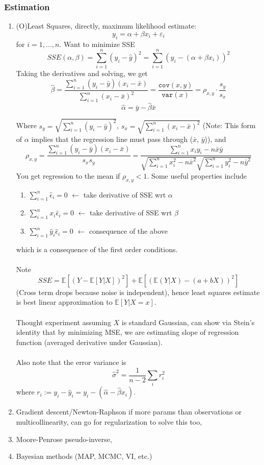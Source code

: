 \documentclass{article}
\begin{document}
\subsubsection{Estimation}
\begin{enumerate}
  \item (O)Least Squares, directly, maximum likelihood estimate:
    $$ y_i = \alpha + \beta x_i + \varepsilon_i $$ for $i=1,\ldots, n$.
    Want to minimize SSE
    $$ SSE(\alpha, \beta) = \sum_{i=1}^{n} (y_i - \hat{y})^2 = \sum_{i=1}^{n} (y_i - (\alpha + \beta x_i))^2$$
    Taking the derivatives and solving, we get
    $$ \hat{\beta} = \frac{\sum_{i=1}^{n}(y_i - \bar{y})(x_i - \bar{x})}{\sum_{i=1}^{n}(x_i - \bar{x})^2} = \frac{\mathtt{cov}(x, y)}{\mathtt{var}(x)} = \rho_{x, y} \cdot \frac{s_y}{s_x}$$
    $$ \hat{\alpha} = \bar{y} - \hat{\beta} \bar{x}$$

    Where $s_y = \sqrt{\sum_{i=1}^{n}(y_i - \bar{y})^2}$,  $s_x = \sqrt{\sum_{i=1}^{n}(x_i - \bar{x})^2}$ (Note: This form of $\alpha$ implies that the regression line must pass through ($\bar{x}$, $\bar{y}$)), and
    $$\rho_{x, y} = \frac{\sum_{i=1}^{n}(y_i - \bar{y})(x_i - \bar{x})}{s_x s_y} = \frac{\sum_{i=1}^{n}x_iy_i - n\bar{x}\bar{y}}{\sqrt{\sum_{i=1}^{n}x_i^2 - n \bar{x}^2}\sqrt{\sum_{i=1}^{n}y_i^2 - n \bar{y}^2}}$$
    You get regression to the mean if $\rho_{x, y} < 1$. Some useful properties include
    \begin{enumerate}
      \item $\sum_{i=1}^{n} \hat{\epsilon}_i= 0$ $\leftarrow$ take derivative of SSE wrt $\alpha$
      \item $\sum_{i=1}^{n} x_i\hat{\epsilon}_i= 0$ $\leftarrow$ take derivative of SSE wrt $\beta$
      \item $\sum_{i=1}^{n} \hat{y}_i\hat{\epsilon}_i= 0$ $\leftarrow$ consequence of the above
    \end{enumerate}
    which is a consequence of the first order conditions.
    \\ \\
    Note $$ SSE = \mathbb{E}[(Y - \mathbb{E}[Y|X])^2] + \mathbb{E}[(\mathbb{E}(Y|X) - (a + bX))^2] $$
    (Cross term drops because noise is independent), hence least squares estimate is best linear approximation to $\mathbb{E}[Y|X = x]$.
    \\ \\
    Thought experiment assuming $X$ is standard Gaussian, can show via Stein's identity that by minimizing MSE, we are estimating slope of regression function (averaged derivative under Gaussian).
    \\ \\
    Also note that the error variance is $$ \hat{\sigma}^2 = \frac{1}{n-2} \sum_{i}r_i^2 $$
    where $r_i := y_i - \hat{y}_i = y_i - (\hat{\alpha} - \hat{\beta}x_i)$.
  \item Gradient descent/Newton-Raphson if more params than observations or multicollinearity, can go for regularization to solve this too,
  \item Moore-Penrose pseudo-inverse,
  \item Bayesian methods (MAP, MCMC, VI, etc.)
\end{enumerate}
\end{document}
